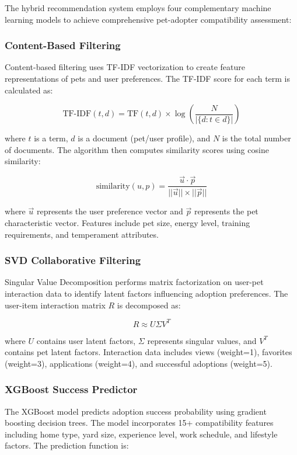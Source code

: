 \documentclass[conference]{IEEEtran}
\begin{document}
The hybrid recommendation system employs four complementary machine learning models to achieve comprehensive pet-adopter compatibility assessment:

\subsubsection{Content-Based Filtering}
Content-based filtering uses TF-IDF vectorization to create feature representations of pets and user preferences. The TF-IDF score for each term is calculated as:

\begin{equation}
\text{TF-IDF}(t,d) = \text{TF}(t,d) \times \log\left(\frac{N}{|\{d : t \in d\}|}\right)
\end{equation}

where $t$ is a term, $d$ is a document (pet/user profile), and $N$ is the total number of documents. The algorithm then computes similarity scores using cosine similarity:

\begin{equation}
\text{similarity}(u,p) = \frac{\vec{u} \cdot \vec{p}}{||\vec{u}|| \times ||\vec{p}||}
\end{equation}

where $\vec{u}$ represents the user preference vector and $\vec{p}$ represents the pet characteristic vector. Features include pet size, energy level, training requirements, and temperament attributes.

\subsubsection{SVD Collaborative Filtering}
Singular Value Decomposition performs matrix factorization on user-pet interaction data to identify latent factors influencing adoption preferences. The user-item interaction matrix $R$ is decomposed as:

\begin{equation}
R \approx U \Sigma V^T
\end{equation}

where $U$ contains user latent factors, $\Sigma$ represents singular values, and $V^T$ contains pet latent factors. Interaction data includes views (weight=1), favorites (weight=3), applications (weight=4), and successful adoptions (weight=5).

\subsubsection{XGBoost Success Predictor}
The XGBoost model predicts adoption success probability using gradient boosting decision trees. The model incorporates 15+ compatibility features including home type, yard size, experience level, work schedule, and lifestyle factors. The prediction function is:
\end{document}

